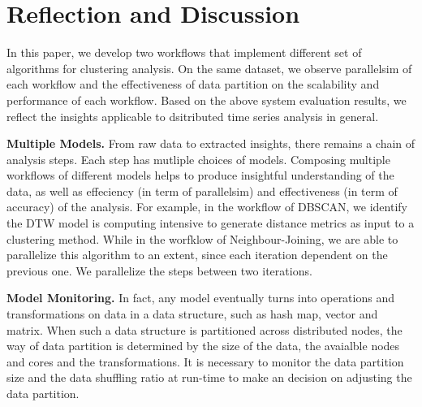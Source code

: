 \chapter{Reflection and Discussion}

In this paper, we develop two workflows that implement different set of algorithms for clustering analysis. On the same dataset, we observe parallelsim of each workflow and the effectiveness of data partition on the scalability and performance of each workflow. Based on the above system evaluation results, we reflect the insights applicable to dsitributed time series analysis in general. 

\textbf{Multiple Models.} From raw data to extracted insights, there remains a chain of analysis steps. Each step has mutliple choices of models. Composing multiple workflows of different models helps to produce insightful understanding of the data, as well as  effeciency (in term of parallelsim) and effectiveness (in term of accuracy) of the analysis. For example, in the workflow of DBSCAN, we identify the DTW model is computing intensive to generate distance metrics as input to a clustering method. While in the worfklow of Neighbour-Joining, we are able to parallelize this algorithm to an extent, since each iteration dependent on the previous one. We parallelize the steps between two iterations. 


\textbf{Model Monitoring.} In fact, any model eventually turns into operations and transformations on data in a data structure, such as hash map, vector and matrix.  When such a data structure is partitioned across distributed nodes, the way of data partition is determined by the size of the data, the avaialble nodes and cores and the transformations. It is necessary to monitor the data partition size and the data shuffling ratio at run-time to make an decision on adjusting the data partition. 
